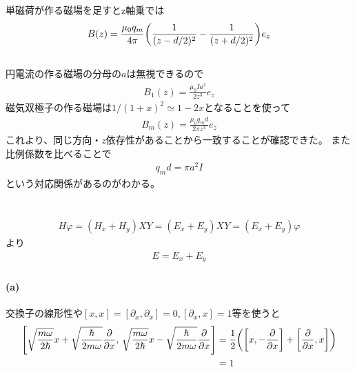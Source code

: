 \documentclass[../../master.tex]{subfiles}
\begin{document}
\section{}
単磁荷が作る磁場を足すとz軸乗では
\begin{align}
    B(z) =\frac{\mu_0q_m}{4\pi}\qty(\frac{1}{(z-d/2)^2}-\frac{1}{(z+d/2)^2})e_z
\end{align}

\section{}
円電流の作る磁場の分母の\(a\)は無視できるので
\begin{align}
    B_1(z) = \frac{\mu_0 Ia^2}{2z^3}e_z
\end{align}
磁気双極子の作る磁場は\(1/(1+x)^2\simeq 1-2x\)となることを使って
\begin{align}
    B_m(z) = \frac{\mu_0q_md}{2\pi z^3}e_z
\end{align}
これより、同じ方向・\(z\)依存性があることから一致することが確認できた。
また比例係数を比べることで
\begin{align}
    q_md = \pi a^2I
\end{align}
という対応関係があるのがわかる。


\chapter{}
\section{}
\subsection{}
\begin{align}
    H\varphi = (H_x+ H_y)XY = (E_x+E_y)XY = (E_x+E_y)\varphi
\end{align}
より
\begin{align}
    E=E_x+E_y
\end{align}

\subsection{}
\subsubsection{(a)}
交換子の線形性や\([x,x]=[\partial_x,\partial_x]=0, [\partial_x, x]=1\)等を使うと
\begin{align}
    \qty[\sqrt{\frac{m\omega}{2\hbar}}x+\sqrt{\frac{\hbar}{2m\omega}}\pdv{x},\,
    \sqrt{\frac{m\omega}{2\hbar}}x-\sqrt{\frac{\hbar}{2m\omega}}\pdv{x}]
    &=\frac{1}{2}\qty(\qty[x, -\pdv{x}] + \qty[\pdv{x}, x])\\
    &= 1
\end{align}
\end{document}
